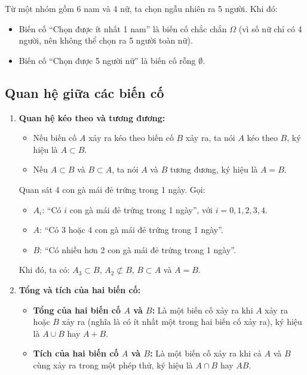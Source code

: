 \begin{vidu}
Từ một nhóm gồm 6 nam và 4 nữ, ta chọn ngẫu nhiên ra 5 người. Khi đó:
\begin{itemize}
    \item Biến cố ``Chọn được ít nhất 1 nam'' là biến cố chắc chắn $\Omega$ (vì số nữ chỉ có 4 người, nên không thể chọn ra 5 người toàn nữ).
    \item Biến cố ``Chọn được 5 người nữ'' là biến cố rỗng $\emptyset$.
\end{itemize}
\end{vidu}

\subsection{Quan hệ giữa các biến cố}
\begin{enumerate}[label=\alph*), leftmargin=1.5em]
    \item \textbf{Quan hệ kéo theo và tương đương:}
    \begin{itemize}
        \item Nếu biến cố $A$ xảy ra kéo theo biến cố $B$ xảy ra, ta nói $A$ kéo theo $B$, ký hiệu là $A \subset B$.
        \item Nếu $A \subset B$ và $B \subset A$, ta nói $A$ và $B$ tương đương, ký hiệu là $A = B$.
    \end{itemize}

    \begin{vidu}
    Quan sát 4 con gà mái đẻ trứng trong 1 ngày. Gọi:
    \begin{itemize}
        \item $A_i$: ``Có $i$ con gà mái đẻ trứng trong 1 ngày'', với $i = 0, 1, 2, 3, 4$.
        \item $A$: ``Có 3 hoặc 4 con gà mái đẻ trứng trong 1 ngày''.
        \item $B$: ``Có nhiều hơn 2 con gà mái đẻ trứng trong 1 ngày''.
    \end{itemize}
    Khi đó, ta có: $A_3 \subset B$, $A_2 \not\subset B$, $B \subset A$ và $A = B$.
    \end{vidu}

    \item \textbf{Tổng và tích của hai biến cố:}
    \begin{itemize}
        \item \textbf{Tổng của hai biến cố $A$ và $B$:} Là một biến cố xảy ra khi $A$ xảy ra hoặc $B$ xảy ra (nghĩa là có ít nhất một trong hai biến cố xảy ra), ký hiệu là $A \cup B$ hay $A + B$.
        \item \textbf{Tích của hai biến cố $A$ và $B$:} Là một biến cố xảy ra khi cả $A$ và $B$ cùng xảy ra trong một phép thử, ký hiệu là $A \cap B$ hay $AB$.
    \end{itemize}


\end{enumerate}
